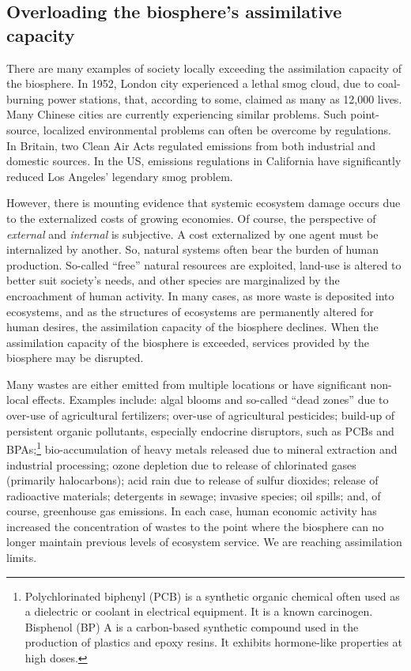 \subsection{Overloading the biosphere's assimilative capacity}


There are many examples of society locally exceeding 
the assimilation capacity of the biosphere.
In 1952, London city experienced a lethal smog cloud,
due to coal-burning power stations,
that, according to some, 
claimed as many as 12,000 lives.\cite{Davis2002,Bell2004}
Many Chinese cities are currently experiencing similar problems.
Such point-source, localized environmental problems can often be overcome
by regulations.
In Britain, two Clean Air Acts regulated emissions from both
industrial and domestic sources.\cite{Brimblecombe2006}	
In the US, emissions regulations in California have 
significantly reduced Los Angeles' legendary smog problem.

However, there is mounting evidence that systemic ecosystem
damage occurs due to the externalized costs
of growing economies.
Of course, the perspective of \emph{external} and \emph{internal} is subjective.
A cost externalized by one agent
must be internalized by another.\cite{MEA2005,Ewing2008}
So, natural systems often bear the burden of human production.
So-called ``free'' natural resources are exploited,
land-use is altered to better suit society's needs,
and other species are marginalized by the encroachment of human activity.\cite{schnaiberg1980}
In many cases, as more waste is deposited into ecosystems,
and as the structures of ecosystems are permanently altered for human desires,
the assimilation capacity of the biosphere declines.
When the assimilation capacity of the biosphere is exceeded, 
services provided by the biosphere may be disrupted.\cite{UNMEA2005}

Many wastes are either emitted from multiple locations or have 
significant non-local effects. 
Examples include:
algal blooms and so-called ``dead zones'' due to over-use of agricultural fertilizers;
over-use of agricultural pesticides;
build-up of persistent organic pollutants, especially endocrine disruptors, such as PCBs 
	and BPAs;\footnote{Polychlorinated biphenyl (PCB) 
		is a synthetic organic chemical often used as 
		a dielectric or coolant in electrical equipment.
		It is a known carcinogen.
		Bisphenol (BP) A is a carbon-based synthetic compound used in the production
		of plastics and epoxy resins. It exhibits hormone-like properties at high doses.
		}
bio-accumulation of heavy metals released due to mineral extraction and industrial processing;
ozone depletion due to release of chlorinated gases (primarily halocarbons);
acid rain due to release of sulfur dioxides;
release of radioactive materials;
detergents in sewage;
invasive species;
oil spills;
and, of course, greenhouse gas emissions.\cite{UNMEA2005, Butler1978, Walker2012}
In each case, human economic activity has increased the concentration
of wastes to the point where the biosphere can no longer maintain 
previous levels of ecosystem service.
We are reaching assimilation limits.


